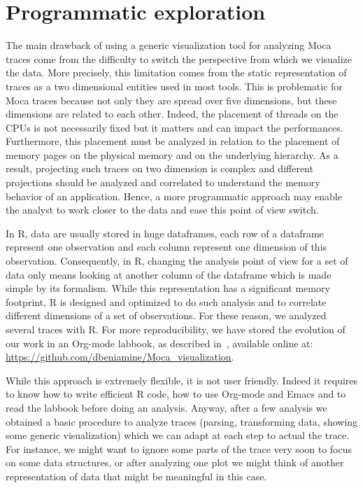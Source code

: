 \section{Programmatic exploration}
\label{sec:visu-second}

The main drawback of using a generic visualization tool for analyzing \gls{Moca} traces come from the difficulty to switch the perspective from which we visualize the data.
More precisely, this limitation comes from the static representation of traces as a two dimensional entities used in most tools.
This is problematic for \gls{Moca} traces because not only they are spread over five dimensions, but these dimensions are related to each other.
Indeed, the placement of threads on the \glspl{CPU} is not necessarily fixed but it matters and can impact the performances.
Furthermore, this placement must be analyzed in relation to the placement of memory pages on the physical memory and on the underlying hierarchy.
As a result, projecting such traces on two dimension is complex and different projections should be analyzed and correlated to understand the memory behavior of an application.
Hence, a more programmatic approach may enable the analyst to work closer to the data and ease this point of view switch.

In \gls{R}, data are usually stored in huge dataframes, each row of a dataframe represent one observation and each column represent one dimension of this observation.
Consequently, in \gls{R}, changing the analysis point of view for a set of data only means looking at another column of the dataframe which is made simple by its formalism.
While this representation has a significant memory footprint, \gls{R} is designed and optimized to do such analysis and to correlate different dimensions of a set of observations.
For these reason, we analyzed several traces with \gls{R}.
For more reproducibility, we have stored the evolution of our work in an \gls{Org-mode} labbook, as described in~\cite[Chapter~4, p~54]{Stanisic15Reproducible}, available online at:\\
\url{https://github.com/dbeniamine/Moca\_visualization}.

While this approach is extremely flexible, it is not user friendly.
Indeed it requires to know how to write efficient \gls{R} code, how to use \gls{Org-mode} and Emacs and to read the labbook before doing an analysis.
Anyway, after a few analysis we obtained a basic procedure to analyze traces (parsing, transforming data, showing some generic visualization) which we can adapt at each step to actual the trace.
For instance, we might want to ignore some parts of the trace very soon to focus on some data structures, or after analyzing one plot we might think of another representation of data that might be meaningful in this case.


